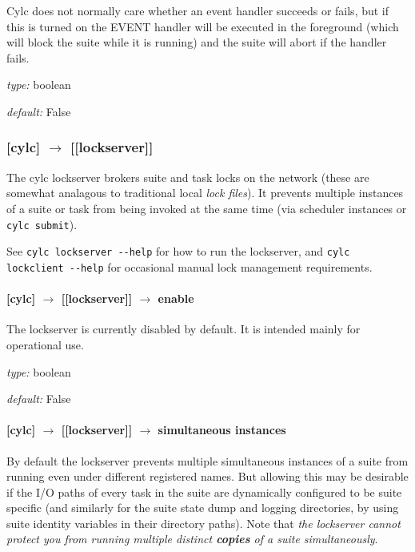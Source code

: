 Cylc does not normally care whether an event handler succeeds or fails,
but if this is turned on the EVENT handler will be executed in the
foreground (which will block the suite while it is running) and the
suite will abort if the handler fails.

\begin{myitemize}
    \item {\em type:} boolean
    \item {\em default:} False
\end{myitemize}

\subsubsection[{[[}lockserver{]]}]{[cylc] $\rightarrow$ [[lockserver]]}

The cylc lockserver brokers suite and task locks on the network (these
are somewhat analagous to traditional local {\em lock files}). It
prevents multiple instances of a suite or task from being invoked 
at the same time (via scheduler instances or \lstinline=cylc submit=).
 
See \lstinline=cylc lockserver --help= for 
how to run the lockserver, and \lstinline=cylc lockclient --help= for 
occasional manual lock management requirements. 

\paragraph[enable]{[cylc] $\rightarrow$ [[lockserver]] $\rightarrow$ enable}

The lockserver is currently disabled by default. It is intended mainly for
operational use.

\begin{myitemize}
    \item {\em type:} boolean
    \item {\em default:} False
\end{myitemize}

\paragraph[simultaneous instances]{[cylc] $\rightarrow$ [[lockserver]] $\rightarrow$ simultaneous instances}

By default the lockserver prevents multiple simultaneous instances of a
suite from running even under different registered names. But allowing
this may be desirable if the I/O paths of every task in the suite are
dynamically configured to be suite specific (and similarly for the suite
state dump and logging directories, by using suite identity variables in
their directory paths). Note that {\em the lockserver cannot protect you
from running multiple distinct {\bf copies} of a suite simultaneously}. 

